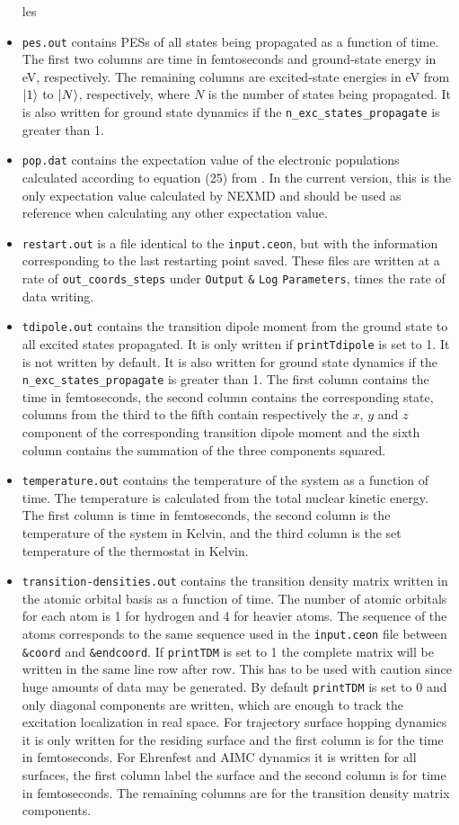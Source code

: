 \begin{itemize}
les
\item \verb+pes.out+ contains PESs of all states being propagated as a function of time.  The first two columns are time in femtoseconds and ground-state energy in eV, respectively.  The remaining columns are excited-state energies in eV from $\ket{1}$ to $\ket{N}$, respectively, where $N$ is the number of states being propagated. It is also written for ground state dynamics if the \verb+n_exc_states_propagate+ is greater than 1.
\item \verb+pop.dat+ contains the expectation value of the electronic populations calculated according to equation (25) from \cite{freixas2018ab}. In the current version, this is the only expectation value calculated by NEXMD and should be used as reference when calculating any other expectation value.
\item \verb+restart.out+ is a file identical to the \verb+input.ceon+, but with the information corresponding to the last restarting point saved. These files are written at a rate of \verb+out_coords_steps+ under \verb+Output+ \verb+&+ \verb+Log+ \verb+Parameters+, times the rate of data writing.
\item \verb+tdipole.out+ contains the transition dipole moment from the ground state to all excited states propagated. It is only written if \verb+printTdipole+ is set to 1. It is not written by default. It is also written for ground state dynamics if the \verb+n_exc_states_propagate+ is greater than 1. The first column contains the time in femtoseconds, the second column contains the corresponding state, columns from the third to the fifth contain respectively the $x$, $y$ and $z$ component of the corresponding transition dipole moment and the sixth column contains the summation of the three components squared.
\item \verb+temperature.out+ contains the temperature of the system as a function of time.  The temperature is calculated from the total nuclear kinetic energy.  The first column is time in femtoseconds, the second column is the temperature of the system in Kelvin, and the third column is the set temperature of the thermostat in Kelvin.
\item \verb+transition-densities.out+ contains the transition density matrix written in the atomic orbital basis as a function of time. The number of atomic orbitals for each atom is 1 for hydrogen and 4 for heavier atoms. The sequence of the atoms corresponds to the same sequence used in the \verb+input.ceon+ file between \verb+&coord+ and \verb+&endcoord+. If \verb+printTDM+ is set to 1 the complete matrix will be written in the same line row after row. This has to be used with caution since huge amounts of data may be generated. By default \verb+printTDM+ is set to 0 and only diagonal components are written, which are enough to track the excitation localization in real space. For trajectory surface hopping dynamics it is only written for the residing surface and the first column is for the time in femtoseconds. For Ehrenfest and AIMC dynamics it is written for all surfaces, the first column label the surface and the second column is for time in femtoseconds. The remaining columns are for the transition density matrix components.

\end{itemize}
